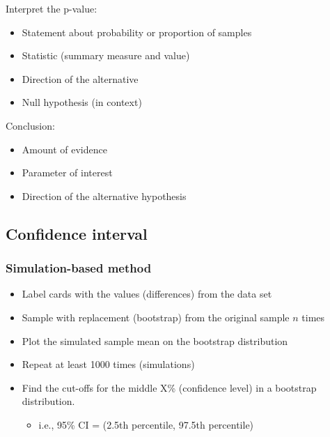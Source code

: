 \documentclass[
]{report}
\providecommand{\tightlist}{%
  \setlength{\itemsep}{0pt}\setlength{\parskip}{0pt}}
\begin{document}
Interpret the p-value:

\begin{itemize}
\item
  Statement about probability or proportion of samples
\item
  Statistic (summary measure and value)
\item
  Direction of the alternative
\item
  Null hypothesis (in context)
\end{itemize}

\vspace{0.8in}

\newpage

Conclusion:

\begin{itemize}
\item
  Amount of evidence
\item
  Parameter of interest
\item
  Direction of the alternative hypothesis
\end{itemize}

\vspace{0.8in}

\subsection*{Confidence interval}\label{confidence-interval}

\subsubsection*{Simulation-based method}\label{simulation-based-method-1}

\begin{itemize}
\item
  Label cards with the values (differences) from the data set
\item
  Sample with replacement (bootstrap) from the original sample \(n\) times
\item
  Plot the simulated sample mean on the bootstrap distribution
\item
  Repeat at least 1000 times (simulations)
\item
  Find the cut-offs for the middle X\% (confidence level) in a bootstrap distribution.

  \begin{itemize}
  \tightlist
  \item
    i.e., 95\% CI = (2.5th percentile, 97.5th percentile)
  \end{itemize}
\end{itemize}
\end{document}
